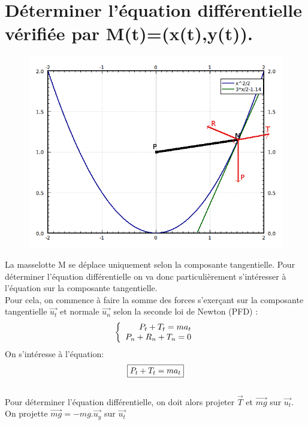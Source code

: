 \documentclass[10pt,a4paper]{article}
\begin{document}
\section{Déterminer l'équation différentielle vérifiée par M(t)=(x(t),y(t)).}
\begin{figure}[H]
	\includegraphics[scale=0.7]{GraphMath2.png}
\end{figure}
La masselotte M se déplace uniquement selon la composante tangentielle. Pour déterminer l'équation différentielle on va donc particulièrement s'intéresser à l'équation sur la composante tangentielle.\\
Pour cela, on commence à faire la somme des forces s'exerçant sur la composante tangentielle $\vec{u_t}$ et normale $\vec{u_n}$ selon la seconde loi de Newton (PFD) :
\[
   \left \{
   \begin{array}{r c l}
      P_t+T_t=ma_t  \\
      P_n+R_n+T_n=0 
   \end{array}
   \right .
\]
On s'intéresse à l'équation: \[\fbox{$P_t+T_t=ma_t$}\] \\ 
Pour déterminer l'équation différentielle, on doit alors projeter $\vec{T}$ et  $\vec{mg}$ sur $\vec{u_t}$. \\
On projette $\vec{mg}=-mg.\vec{u_y}$ sur $\vec{u_t}$\\
\end{document}
